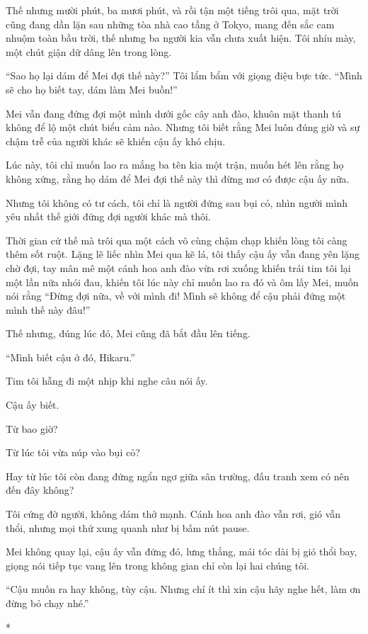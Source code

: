 {Thế nhưng mười phút, ba mươi phút, và rồi tận một tiếng trôi qua, mặt
trời cũng đang dần lặn sau những tòa nhà cao tầng ở Tokyo, mang đến sắc
cam nhuộm toàn bầu trời, thế nhưng ba người kia vẫn chưa xuất hiện. Tôi
nhíu mày, một chút giận dữ dâng lên trong lòng.

``Sao họ lại dám để Mei đợi thế này?'' Tôi lẩm bẩm với giọng điệu bực
tức. ``Mình sẽ cho họ biết tay, dám làm Mei buồn!''

Mei vẫn đang đứng đợi một mình dưới gốc cây anh đào, khuôn mặt thanh tú
không để lộ một chút biểu cảm nào. Nhưng tôi biết rằng Mei luôn đúng giờ
và sự chậm trễ của người khác sẽ khiến cậu ấy khó chịu.

Lúc này, tôi chỉ muốn lao ra mắng ba tên kia một trận, muốn hét lên rằng
họ không xứng, rằng họ dám để Mei đợi thế này thì đừng mơ có được cậu ấy
nữa.

Nhưng tôi không có tư cách, tôi chỉ là người đứng sau bụi cỏ, nhìn người
mình yêu nhất thế giới đứng đợi người khác mà thôi.

Thời gian cứ thế mà trôi qua một cách vô cùng chậm chạp khiến lòng tôi
càng thêm sốt ruột. Lặng lẽ liếc nhìn Mei qua kẽ lá, tôi thấy cậu ấy vẫn
đang yên lặng chờ đợi, tay mân mê một cánh hoa anh đào vừa rơi xuống
khiến trái tim tôi lại một lần nữa nhói đau, khiến tôi lúc này chỉ muốn
lao ra đó và ôm lấy Mei, muốn nói rằng ``Đừng đợi nữa, về với mình đi!
Mình sẽ không để cậu phải đứng một mình thế này đâu!''

Thế nhưng, đúng lúc đó, Mei cũng đã bắt đầu lên tiếng.

``Mình biết cậu ở đó, Hikaru.''

Tim tôi hẫng đi một nhịp khi nghe câu nói ấy.

Cậu ấy biết.

Từ bao giờ?

Từ lúc tôi vừa núp vào bụi cỏ?

Hay từ lúc tôi còn đang đứng ngẩn ngơ giữa sân trường, đấu tranh xem có
nên đến đây không?

Tôi cứng đờ người, không dám thở mạnh. Cánh hoa anh đào vẫn rơi, gió vẫn
thổi, nhưng mọi thứ xung quanh như bị bấm nút pause.

Mei không quay lại, cậu ấy vẫn đứng đó, lưng thẳng, mái tóc dài bị gió
thổi bay, giọng nói tiếp tục vang lên trong không gian chỉ còn lại hai
chúng tôi.

``Cậu muốn ra hay không, tùy cậu. Nhưng chí ít thì xin cậu hãy nghe hết,
làm ơn đừng bỏ chạy nhé.''

*

}
